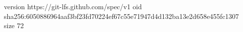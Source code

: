 version https://git-lfs.github.com/spec/v1
oid sha256:6050886964aaf3bf23fd70224ef67c55e71947d4d132ba13e2d658e455fc1307
size 72
